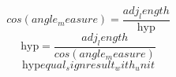 \[cos({angle_measure})=\frac{{{adj_length}}}{{\text{{{hyp}}}}}\]
\[\text{{{hyp}}}=\frac{{{adj_length}}}{{cos({angle_measure})}}\]
\[\text{{{hyp}}}{equal_sign}{result_with_unit}\]
